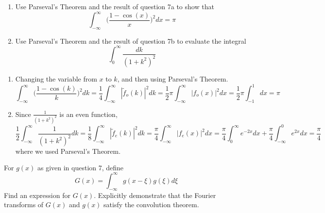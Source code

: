 \documentclass[a4paper]{article}
\begin{document}
\newpage
\begin{qns}\leavevmode
\begin{enumerate}[label=(\alph*)]
\item Use Parseval's Theorem and the result of question 7a to show that
$$\int_{-\infty}^\infty\bigg(\frac{1-\cos(x)}{x}\bigg)^2dx=\pi$$
\item Use Parseval's Theorem and the result of question 7b to evaluate the integral
$$\int_0^\infty\frac{dk}{(1+k^2)^2}$$
\end{enumerate}
\end{qns}
\begin{ans}\leavevmode
\begin{enumerate}[label=(\alph*)]
\item Changing the variable from $x$ to $k$, and then using Parseval's Theorem.
$$\int_{-\infty}^\infty\bigg(\frac{1-\cos(k)}{k}\bigg)^2dk=\frac{1}{4}\int_{-\infty}^\infty|\tilde{f}_o(k)|^2dk=\frac{1}{2}\pi\int_{-\infty}^\infty|f_o(x)|^2dx=\frac{1}{2}\pi\int_{-1}^1dx=\pi$$
\item Since $\frac{1}{(1+k^2)^2}$ is an even function,
$$\frac{1}{2}\int_{-\infty}^\infty\frac{1}{(1+k^2)^2}dk=\frac{1}{8}\int_{-\infty}^\infty|\tilde{f}_e(k)|^2dk=\frac{\pi}{4}\int_{-\infty}^\infty|f_e(x)|^2dx=\frac{\pi}{4}\int_0^\infty e^{-2x}dx+\frac{\pi}{4}\int_{-\infty}^0e^{2x}dx=\frac{\pi}{4}$$
where we used Parseval's Theorem.
\end{enumerate}
\end{ans}
\begin{qns}[Convolution]
For $g(x)$ as given in question 7, define
$$G(x)=\int_{-\infty}^\infty g(x-\xi)g(\xi)d\xi$$
Find an expression for $G(x)$. Explicitly demonstrate that the Fourier transforms of $G(x)$ and $g(x)$ satisfy the convolution theorem.
\end{qns}
\end{document}
